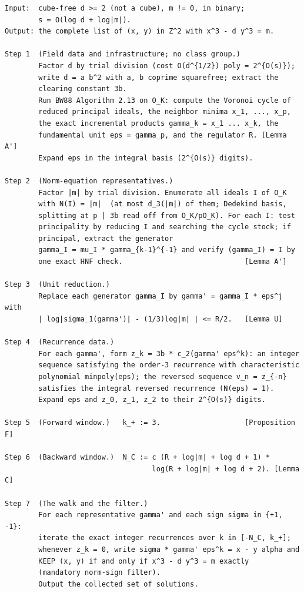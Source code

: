\documentclass[11pt]{amsart}
\theoremstyle{plain}
\theoremstyle{remark}
\begin{document}
\begin{verbatim}
Input:  cube-free d >= 2 (not a cube), m != 0, in binary;
        s = O(log d + log|m|).
Output: the complete list of (x, y) in Z^2 with x^3 - d y^3 = m.

Step 1  (Field data and infrastructure; no class group.)
        Factor d by trial division (cost O(d^{1/2}) poly = 2^{O(s)});
        write d = a b^2 with a, b coprime squarefree; extract the
        clearing constant 3b.
        Run BW88 Algorithm 2.13 on O_K: compute the Voronoi cycle of
        reduced principal ideals, the neighbor minima x_1, ..., x_p,
        the exact incremental products gamma_k = x_1 ... x_k, the
        fundamental unit eps = gamma_p, and the regulator R. [Lemma A']
        Expand eps in the integral basis (2^{O(s)} digits).

Step 2  (Norm-equation representatives.)
        Factor |m| by trial division. Enumerate all ideals I of O_K
        with N(I) = |m|  (at most d_3(|m|) of them; Dedekind basis,
        splitting at p | 3b read off from O_K/pO_K). For each I: test
        principality by reducing I and searching the cycle stock; if
        principal, extract the generator
        gamma_I = mu_I * gamma_{k-1}^{-1} and verify (gamma_I) = I by
        one exact HNF check.                             [Lemma A']

Step 3  (Unit reduction.)
        Replace each generator gamma_I by gamma' = gamma_I * eps^j with
        | log|sigma_1(gamma')| - (1/3)log|m| | <= R/2.   [Lemma U]

Step 4  (Recurrence data.)
        For each gamma', form z_k = 3b * c_2(gamma' eps^k): an integer
        sequence satisfying the order-3 recurrence with characteristic
        polynomial minpoly(eps); the reversed sequence v_n = z_{-n}
        satisfies the integral reversed recurrence (N(eps) = 1).
        Expand eps and z_0, z_1, z_2 to their 2^{O(s)} digits.

Step 5  (Forward window.)   k_+ := 3.                    [Proposition F]

Step 6  (Backward window.)  N_C := c (R + log|m| + log d + 1) *
                                   log(R + log|m| + log d + 2). [Lemma C]

Step 7  (The walk and the filter.)
        For each representative gamma' and each sign sigma in {+1, -1}:
        iterate the exact integer recurrences over k in [-N_C, k_+];
        whenever z_k = 0, write sigma * gamma' eps^k = x - y alpha and
        KEEP (x, y) if and only if x^3 - d y^3 = m exactly
        (mandatory norm-sign filter).
        Output the collected set of solutions.
\end{verbatim}
\end{document}
